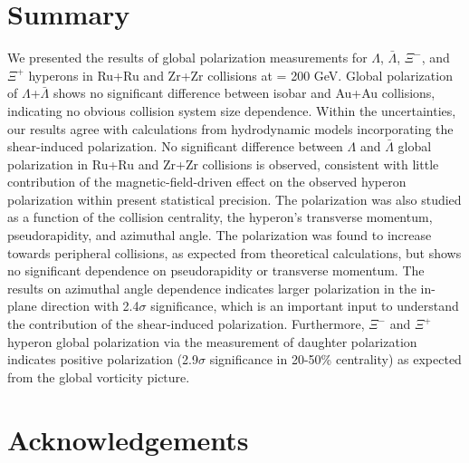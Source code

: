 \documentclass[preprint,5p,times,twocolumn]{elsarticle}
\begin{document}
\section{Summary}

We presented the results of global polarization measurements for $\Lambda$, $\bar\Lambda$, $\Xi^-$, and $\Xi^+$ hyperons in Ru+Ru and Zr+Zr collisions at \snn = 200 GeV. 
Global polarization of $\Lambda$+$\bar\Lambda$ shows no significant difference between isobar and Au+Au collisions, indicating no obvious collision system size dependence. 
Within the uncertainties, our results agree with calculations from hydrodynamic models incorporating the shear-induced polarization. 
No significant difference between $\Lambda$ and $\bar\Lambda$ global polarization in Ru+Ru and Zr+Zr collisions is observed, consistent with little contribution of the magnetic-field-driven effect on the observed hyperon polarization within present statistical precision. 
The polarization was also studied as a function of the collision centrality, the hyperon's transverse momentum, pseudorapidity, and azimuthal angle. 
The polarization was found to increase towards peripheral collisions, as expected from theoretical calculations, but shows no significant dependence on pseudorapidity or transverse momentum. 
The results on azimuthal angle dependence indicates larger polarization in the in-plane direction with 2.4$\sigma$ significance, which is an important input to understand the contribution of the shear-induced polarization.
Furthermore, $\Xi^-$ and $\Xi^+$ hyperon global polarization via the measurement of daughter \lam polarization indicates positive polarization (2.9$\sigma$ significance in 20-50\% centrality) as expected from the global vorticity picture. 

\section*{Acknowledgements}




%
%

%

\end{document}
